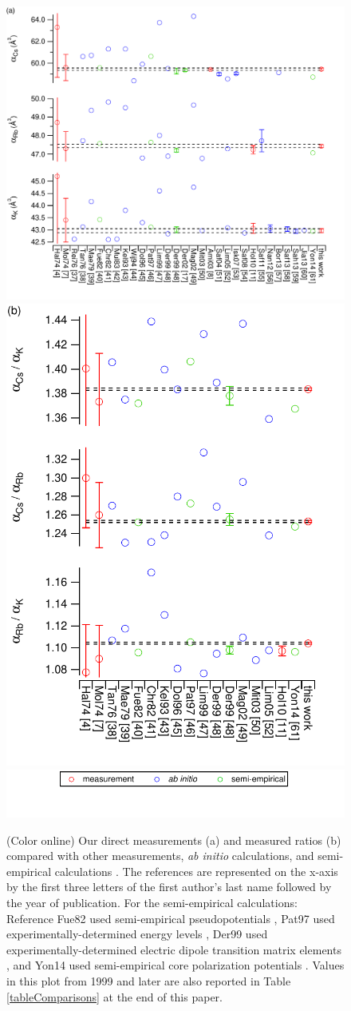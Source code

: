 \documentclass[twocolumn,pra,showpacs,superscriptaddress,longbibliography]{revtex4-1}   %
\begin{document}
\begin{figure}
\includegraphics[width=0.60\linewidth,keepaspectratio]{displayAbsComps.pdf}
\includegraphics[width=0.38\linewidth,keepaspectratio]{displayRatComps.pdf}
\includegraphics[width=0.55\linewidth,keepaspectratio]{displayCompsLegend.pdf}
\caption{\label{comparisons}(Color online) Our direct measurements (a) and measured ratios (b) compared with other measurements, \textit{ab initio} calculations, and semi-empirical calculations 
\cite{Hall1974,Molof1974a,Reinsch1976,Tang1976,Kutzelnigg1978,
Fuentealba1999,Christiansen1982,Muller1984,Kello1993,VanWijngaarden1994,
Dolg1996,Patil1997,Lim1999,Derevianko1998,Magnier2002,Derevianko2001,
Mitroy2003,Amini2003,Safronova2004,Lim2005,Iskrenova-Tchoukova2007,Safronova2008,
Holmgren2010,Safronova2011,Nandy2012,Borschevsky2013,Safronova2013,Sahoo2013,Jiang2013,
Safronova2013,Y.-B.2014}.
The references are represented on the x-axis by the first three letters of the first author's last name followed by the year of publication. For the semi-empirical calculations: Reference Fue82 used semi-empirical pseudopotentials \cite{Fuentealba1999}, Pat97 used experimentally-determined energy levels \cite{Patil1997}, Der99 used experimentally-determined electric dipole transition matrix elements \cite{Derevianko1998}, and Yon14 used semi-empirical core polarization potentials \cite{Y.-B.2014}. Values in this plot from 1999 and later are also reported in Table \ref{tableComparisons} at the end of this paper.}
\end{figure}
\end{document}
